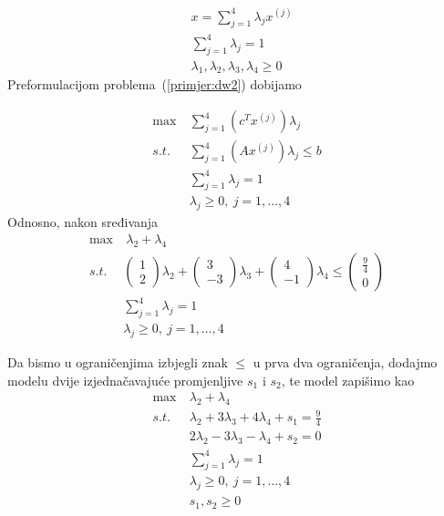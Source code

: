 \documentclass[a4paper, utf8, 11pt, colorlinks]{book}
\theoremstyle{definition}
\begin{document}
$$\begin{aligned}
&x = \sum_{j=1}^4\lambda_j x^{(j)}\\
&\sum_{j=1}^4\lambda_j=1\\
&\lambda_1,\lambda_2,\lambda_3,\lambda_4\geqslant 0
\end{aligned}$$
 Preformulacijom problema~(\ref{primjer:dw2}) dobijamo
 
     \begin{equation}
 	\begin{aligned}\label{primjer:dw3}
 		\max\  & \sum_{j=1}^4(c^T  x^{(j)})\lambda_j\\
 		s.t.\  &\sum_{j=1}^4 (A  x^{(j)})\lambda_j\leqslant b\\
 		&\sum_{j=1}^4\lambda_j = 1\\
 		&\lambda_j\geqslant 0,\ j = 1,\ldots,4
 	\end{aligned}
 \end{equation}
 Odnosno, nakon sređivanja 
      \begin{equation}
 	\begin{aligned}\label{primjer:dw4}
 		\max  &\  \lambda_2+\lambda_4\\
 		s.t.\  &\left(\begin{array}{c}
 			1\\
 			2
 		\end{array}\right)\lambda_2+\left(\begin{array}{c}
 		3\\
 		-3
 	\end{array}\right)\lambda_3+\left(\begin{array}{c}
 	4\\
 	-1
 \end{array}\right)\lambda_4\leqslant \left(\begin{array}{c}
 			\frac 9 4\\
 			0
 		\end{array}\right)\\
 		&\sum_{j=1}^4\lambda_j = 1\\
 		&\lambda_j\geqslant 0,\ j = 1,\ldots,4
 	\end{aligned}
 \end{equation}

Da bismo u ograničenjima izbjegli znak $\leqslant$ u prva dva ograničenja, dodajmo modelu dvije izjednačavajuće promjenljive $s_1$ i $s_2$, te model zapišimo kao
      \begin{equation}
	\begin{aligned}\label{primjer:dw5}
		\max\  & \lambda_2+\lambda_4\\
		s.t.\  &\lambda_2+3\lambda_3+4\lambda_4+s_1=\frac 94\\
		&2\lambda_2-3\lambda_3-\lambda_4+s_2=0\\
		&\sum_{j=1}^4\lambda_j = 1\\
		&\lambda_j\geqslant 0,\ j = 1,\ldots,4\\
		&s_1,s_2\geqslant 0
	\end{aligned}
\end{equation}
\end{document}
